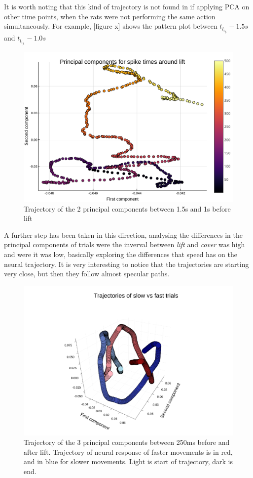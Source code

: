 It is worth noting that this kind of trajectory is not found in if applying PCA on other time points, when the rats were not performing the same action simultaneously. For example, [figure x] shows the pattern plot between $t_l_i_f_t-1.5s$ and $t_l_i_f_t-1.0s$
\begin{figure}[h]
	\centering
	\includegraphics[scale=0.8]{../../plots/pca-500-before-lift.pdf}
	\caption{Trajectory of the 2 principal components between 1.5s and 1s before lift}
	\label{fig:pca-500-before-lift}
\end{figure}


A further step has been taken in this direction, analysing the differences in the principal components of trials were the inverval between \emph{lift} and \emph{cover} was high and were it was low, basically exploring the differences that speed has on the neural trajectory.
It is very interesting to notice that the trajectories are starting very close, but then they follow almost specular paths.

\begin{figure}[h]
	\centering
	\includegraphics[scale=0.8]{../../plots/pca-speed.pdf}
	\caption{Trajectory of the 3 principal components  between 250ms before and after lift. Trajectory of neural response of faster movements is in red, and in blue for slower movements. Light is start of trajectory, dark is end.}
	\label{fig:pca-500-before-lift}
\end{figure}

